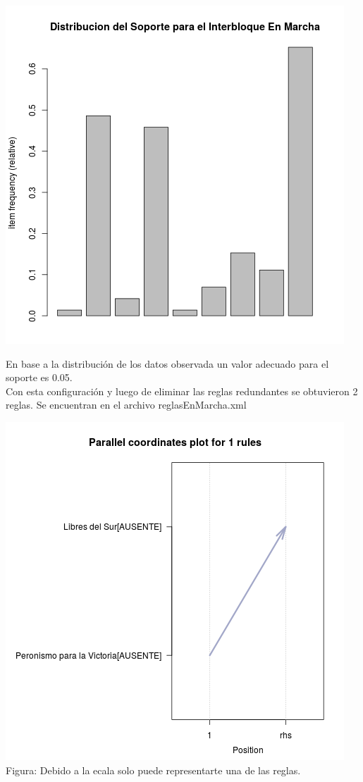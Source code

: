 \documentclass{endm}
\begin{document}
\begin{center}
\includegraphics[scale=0.4]{graficos/soportesInterbloquesEnMarcha.png}
\end{center}

En base a la distribución de los datos observada un valor adecuado para el soporte es 0.05.\\

Con esta configuración y luego de eliminar las reglas redundantes se obtuvieron 2 reglas. Se encuentran en el archivo reglasEnMarcha.xml  \\

\begin{center}
\includegraphics[scale=0.5]{graficos/paracoordEnMarcha.png} \\
\scriptsize{Figura: Debido a la ecala solo puede representarte una de las reglas.} \\
\end{center}
\end{document}
